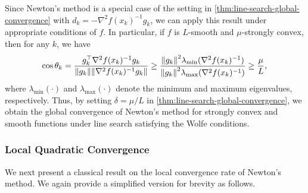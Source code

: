 \documentclass[en]{subfiles}
\begin{document}
Since Newton's method is a special case of the setting in \cref{thm:line-search-global-convergence} with $d_k = -\nabla^2 f(x_k)^{-1} g_k$, we can apply this result under appropriate conditions of $f$.
In particular, if $f$ is $L$-smooth and $\mu$-strongly convex, then for any $k$, we have
\begin{equation*}
    \cos \theta_k
    = \frac{g_k^\top \nabla^2 f(x_k)^{-1} g_k}{\norm{g_k}\norm{\nabla^2 f(x_k)^{-1} g_k}}
    \geq \frac{\norm{g_k}^2 \lambda_{\min}(\nabla^2 f(x_k)^{-1})}{\norm{g_k}^2 \lambda_{\max}(\nabla^2 f(x_k)^{-1})}
    \geq \frac{\mu}{L},
\end{equation*}
where $\lambda_{\min}(\cdot)$ and $\lambda_{\max}(\cdot)$ denote the minimum and maximum eigenvalues, respectively.
Thus, by setting $\delta = \mu / L$ in \cref{thm:line-search-global-convergence}, we obtain the global convergence of Newton's method for strongly convex and smooth functions under line search satisfying the Wolfe conditions.

\subsubsection{Local Quadratic Convergence}

We next present a classical result on the local convergence rate of Newton's method.
We again provide a simplified version for brevity as follows.
\end{document}
